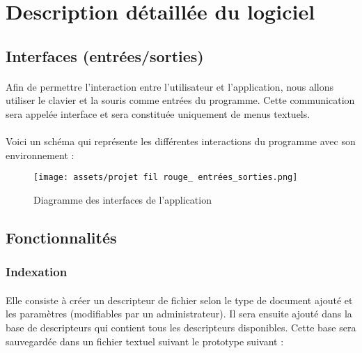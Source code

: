 \section{Description détaillée du logiciel}
\subsection{Interfaces (entrées/sorties)}
\paragraph{}
Afin de permettre l'interaction entre l’utilisateur et l’application, nous allons utiliser le clavier et la souris comme entrées du programme. Cette communication sera appelée interface et sera constituée uniquement de menus textuels.

\paragraph{}
Voici un schéma qui représente les différentes interactions du programme avec son environnement :

\begin{figure}[h]
    \begin{center}
        \texttt{[image: assets/projet fil rouge\_ entrées\_sorties.png]}
        \caption{Diagramme des interfaces de l'application}
    \end{center}
\end{figure}

\subsection{Fonctionnalités}
\subsubsection{Indexation}
\paragraph{}
Elle consiste à créer un descripteur de fichier selon le type de document ajouté et les paramètres (modifiables par un administrateur). Il sera ensuite ajouté dans la base de descripteurs qui contient tous les descripteurs disponibles. Cette base sera sauvegardée dans un fichier textuel suivant le prototype suivant :
